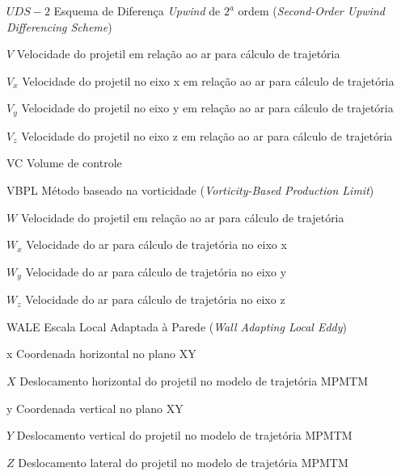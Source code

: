 \begin{siglas}
    \item[$UDS-2$] Esquema de Diferença \textit{Upwind} de $2^a$ ordem (\textit{Second-Order Upwind Differencing Scheme})
    \item[$V$] Velocidade do projetil em relação ao ar para cálculo de trajetória
    \item[$V_x$] Velocidade do projetil no eixo x em relação ao ar para cálculo de trajetória
    \item[$V_y$] Velocidade do projetil no eixo y em relação ao ar para cálculo de trajetória
    \item[$V_z$] Velocidade do projetil no eixo z em relação ao ar para cálculo de trajetória
    \item[VC] Volume de controle
    \item[VBPL] Método baseado na vorticidade (\textit{Vorticity-Based Production Limit})
    \item[$W$] Velocidade do projetil em relação ao ar para cálculo de trajetória
    \item[$W_x$] Velocidade do ar para cálculo de trajetória no eixo x
    \item[$W_y$] Velocidade do ar para cálculo de trajetória no eixo y
    \item[$W_z$] Velocidade do ar para cálculo de trajetória no eixo z
    \item[WALE] Escala Local Adaptada à Parede (\textit{Wall Adapting Local Eddy})
    \item[x] Coordenada horizontal no plano XY
    \item[$X$] Deslocamento horizontal do projetil no modelo de trajetória MPMTM
    \item[y] Coordenada vertical no plano XY
    \item[$Y$] Deslocamento vertical do projetil no modelo de trajetória MPMTM
    \item[$Z$] Deslocamento lateral do projetil no modelo de trajetória MPMTM
\end{siglas}


